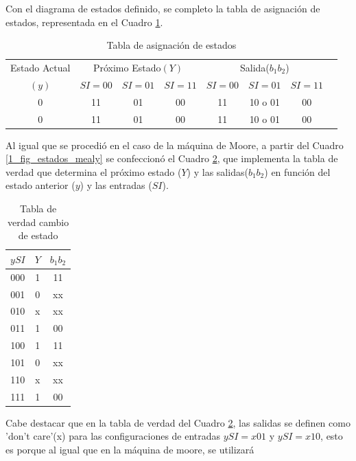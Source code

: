 \documentclass[10pt,a4paper]{article}
\begin{document}
Con el diagrama de estados definido, se completo la tabla de asignación de estados, representada en el Cuadro \ref{1_tabla_mealy_estados}.

\begin{table}[ht]
	\centering
	\begin{tabular}{c|c|c|c|c|c|c|c}
	Estado Actual & \multicolumn{3}{c|}{Próximo Estado$(Y)$} & \multicolumn{3}{c|}{Salida($b_1b_2$)}\\
	\cline{2-7}
	$(y)$ & $SI=00$ & $SI=01$ & $SI=11$ & $SI=00$ & $SI=01$ & $SI=11$ \\
	\hline
	0 & 11 & 01 & 00 & 11 & 10 o 01 & 00 \\
	0 & 11 & 01 & 00 & 11 & 10 o 01 & 00\\
	\end{tabular}
	\caption{Tabla de asignación de estados} \label{1_tabla_mealy_estados}
\end{table}

Al igual que se procedió en el caso de la máquina de Moore, a partir del Cuadro \ref{1_fig_estados_mealy} se confeccionó el Cuadro \ref{1_tabla_verdad_mealy}, que implementa la tabla de verdad que determina el próximo estado ($Y$) y las salidas($b_1b_2$) en función del estado anterior ($y$) y las entradas ($SI$). 

\begin{table}[H]
	\centering
	\begin{tabular}{c|c|c}
	$ySI$ & $Y$ & $b_1b_2$ \\ 
	\hline 
	000 & 1 & 11  \\ 
	\hline 
	001 & 0 & xx  \\ 
	\hline 
	010 & x & xx  \\ 
	\hline 
	011 & 1 & 00  \\ 
	\hline 
	100 & 1 & 11  \\ 
	\hline 
	101 & 0 & xx  \\ 
	\hline 
	110 & x & xx  \\ 
	\hline 
	111 & 1 & 00  \\ 
	\end{tabular} 
	\caption{Tabla de verdad cambio de estado} \label{1_tabla_verdad_mealy}
\end{table}

Cabe destacar que en la tabla de verdad del Cuadro \ref{1_tabla_verdad_mealy}, las salidas se definen como 'don't care'(x) para las configuraciones de entradas $ySI = x01$ y $ySI = x10$, esto es porque al igual que en la máquina de moore, se utilizará


\end{document}
